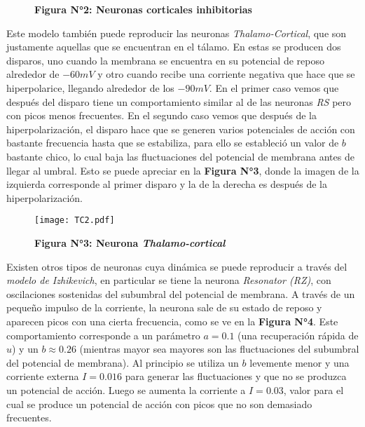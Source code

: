 \documentclass[12pt,a4paper]{article}
\begin{document}
\begin{figure}[h!]
\centering
\caption*{\textbf{Figura N°2: Neuronas corticales inhibitorias}}
\end{figure}
 
Este modelo también puede reproducir las neuronas \textit{Thalamo-Cortical}, que son justamente aquellas que se encuentran en el tálamo. En estas se producen dos disparos, uno cuando la membrana se encuentra en su potencial de reposo alrededor de $-60mV$ y otro cuando recibe una corriente negativa que hace que se hiperpolarice, llegando alrededor de los $-90mV$. En el primer caso vemos que después del disparo tiene un comportamiento similar al de las neuronas \textit{RS} pero con picos menos frecuentes. En el segundo caso vemos que después de la hiperpolarización, el disparo hace que se generen varios potenciales de acción con bastante frecuencia hasta que se estabiliza, para ello se estableció un valor de $b$ bastante chico, lo cual baja las fluctuaciones del potencial de membrana antes de llegar al umbral. Esto se puede apreciar en la \textbf{Figura N°3}, donde la imagen de la izquierda corresponde al primer disparo y la de la derecha es después de la hiperpolarización. 

\begin{figure}[H]
\centering
\caption*{\textbf{Figura N°3: Neurona \textit{Thalamo-cortical}}}
\texttt{[image: TC2.pdf]}
\end{figure}

Existen otros tipos de neuronas cuya dinámica se puede reproducir a través del \textit{modelo de Izhikevich}, en particular se tiene la neurona \textit{Resonator (RZ)}, con oscilaciones sostenidas del subumbral del potencial de membrana. A través de un pequeño impulso de la corriente, la neurona sale de su estado de reposo y aparecen picos con una cierta frecuencia, como se ve en la \textbf{Figura N°4}. Este comportamiento corresponde a un parámetro $a = 0.1$ (una recuperación rápida de $u$) y un $b \approx 0.26$ (mientras mayor sea mayores son las fluctuaciones del subumbral del potencial de membrana). Al principio se utiliza un $b$ levemente menor y una corriente externa $I = 0.016$ para generar las fluctuaciones y que no se produzca un potencial de acción. Luego se aumenta la corriente a $I = 0.03$, valor para el cual se produce un potencial de acción con picos que no son demasiado frecuentes. 
\end{document}
